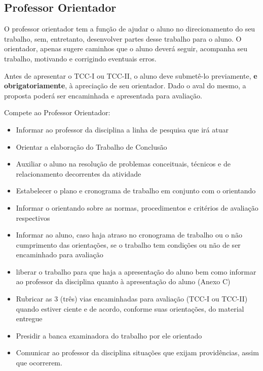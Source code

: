 \subsection{Professor Orientador}

O professor orientador tem a fun\c{c}\~{a}o de ajudar o aluno no direcionamento do seu trabalho, sem, entretanto, desenvolver partes desse 
trabalho para o aluno. O orientador, apenas sugere caminhos que o aluno dever\'{a} seguir, acompanha seu trabalho, motivando e corrigindo eventuais erros.

Antes de apresentar o TCC-I ou TCC-II, o aluno deve submet\^{e}-lo previamente, \textbf{e obrigatoriamente}, \`{a} aprecia\c{c}\~{a}o de seu orientador. 
Dado o aval do mesmo, a proposta poder\'{a} ser encaminhada e apresentada para avalia\c{c}\~{a}o.

Compete ao Professor Orientador:

	\begin{itemize}
		\item Informar ao professor da disciplina a linha de pesquisa que ir\'{a} atuar
	
		\item Orientar a elabora\c{c}\~{a}o do Trabalho de Conclus\~{a}o
	
		\item Auxiliar o aluno na resolu\c{c}\~{a}o de problemas conceituais, t\'{e}cnicos e de relacionamento decorrentes da atividade
	
		\item Estabelecer o plano e cronograma de trabalho em conjunto com o orientando
	
		\item Informar o orientando sobre as normas, procedimentos e crit\'{e}rios de avalia\c{c}\~{a}o respectivos
	
		\item Informar ao aluno, caso haja atraso no cronograma de trabalho ou o n\~{a}o cumprimento das orienta\c{c}\~{o}es, se o trabalho tem condi\c{c}\~{o}es ou n\~{a}o de ser 
		encaminhado para avalia\c{c}\~{a}o
	
		\item liberar o trabalho para que haja a apresenta\c{c}\~{a}o do aluno bem como informar ao professor da disciplina quanto \`{a} apresenta\c{c}\~{a}o do aluno (Anexo C)
	
		\item Rubricar as 3 (tr\^{e}s) vias encaminhadas para avalia\c{c}\~{a}o (TCC-I ou TCC-II) quando estiver ciente e de acordo, 
		conforme suas orienta\c{c}\~{o}es, do material entregue
	
		\item Presidir a banca examinadora do trabalho por ele orientado
	
		\item Comunicar ao professor da disciplina situa\c{c}\~{o}es que exijam provid\^{e}ncias, assim que ocorrerem.
	\end{itemize}


